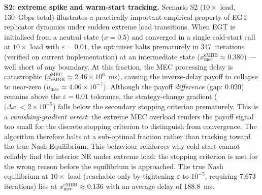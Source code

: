 \documentclass[conference]{IEEEtran}
\begin{document}
\textbf{S2: extreme spike and warm-start tracking.}
Scenario S2 ($10\times$ load, 130~Gbps total) illustrates a
practically important empirical property of EGT replicator
dynamics under sudden extreme load transitions.
When EGT is initialised from a neutral state ($x = 0.5$) and
converged in a single cold-start call at $10\times$ load with
$\varepsilon = 0.01$, the optimiser halts prematurely in
347~iterations (verified on current implementation) at an intermediate state
($x_\text{mec}^\text{eMBB} \approx 0.380$) --- well short of
any boundary. At this fraction, the MEC processing delay is
catastrophic ($d_\text{eMBB}^\text{MEC} \approx 2.46\times10^6$~ms),
causing the inverse-delay payoff to collapse to near-zero
($u_\text{mec} \approx 4.06\times10^{-7}$). Although the payoff
\emph{difference} (gap: 0.020) remains above the
$\varepsilon = 0.01$ tolerance, the strategy-change gradient
($|\Delta x| < 2\times 10^{-5}$) falls below the secondary stopping
criterion prematurely. This is a \emph{vanishing-gradient arrest}: the
extreme MEC overload renders the payoff signal too small for
the discrete stopping criterion to distinguish from convergence.
The algorithm therefore halts at a sub-optimal fraction rather
than tracking toward the true Nash Equilibrium. This behaviour
reinforces why cold-start cannot reliably find the interior NE
under extreme load: the stopping criterion is met for the wrong
reason before the equilibrium is approached.
The true Nash equilibrium at $10\times$
load (reachable only by tightening $\varepsilon$ to $10^{-5}$,
requiring 7,673 iterations) lies at
$x_\text{mec}^\text{eMBB} \approx 0.136$ with an average
delay of 188.8~ms.
\end{document}
